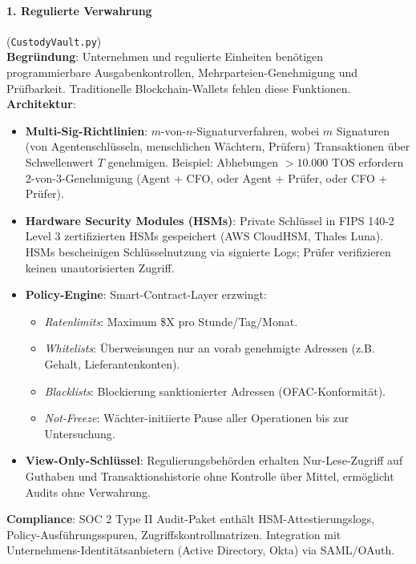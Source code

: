 \documentclass[11pt]{article}
\begin{document}
\paragraph{1. Regulierte Verwahrung} (\texttt{CustodyVault.py})\\
\textbf{Begründung}: Unternehmen und regulierte Einheiten benötigen programmierbare Ausgabenkontrollen, Mehrparteien-Genehmigung und Prüfbarkeit. Traditionelle Blockchain-Wallets fehlen diese Funktionen.\\
\textbf{Architektur}:
\begin{itemize}[noitemsep]
  \item \textbf{Multi-Sig-Richtlinien}: $m$-von-$n$-Signaturverfahren, wobei $m$ Signaturen (von Agentenschlüsseln, menschlichen Wächtern, Prüfern) Transaktionen über Schwellenwert $T$ genehmigen. Beispiel: Abhebungen $>10.000$ TOS erfordern 2-von-3-Genehmigung (Agent + CFO, oder Agent + Prüfer, oder CFO + Prüfer).
  \item \textbf{Hardware Security Modules (HSMs)}: Private Schlüssel in FIPS 140-2 Level 3 zertifizierten HSMs gespeichert (AWS CloudHSM, Thales Luna). HSMs bescheinigen Schlüsselnutzung via signierte Logs; Prüfer verifizieren keinen unautorisierten Zugriff.
  \item \textbf{Policy-Engine}: Smart-Contract-Layer erzwingt:
    \begin{itemize}[noitemsep]
      \item \emph{Ratenlimits}: Maximum \$X pro Stunde/Tag/Monat.
      \item \emph{Whitelists}: Überweisungen nur an vorab genehmigte Adressen (z.B. Gehalt, Lieferantenkonten).
      \item \emph{Blacklists}: Blockierung sanktionierter Adressen (OFAC-Konformität).
      \item \emph{Not-Freeze}: Wächter-initiierte Pause aller Operationen bis zur Untersuchung.
    \end{itemize}
  \item \textbf{View-Only-Schlüssel}: Regulierungsbehörden erhalten Nur-Lese-Zugriff auf Guthaben und Transaktionshistorie ohne Kontrolle über Mittel, ermöglicht Audits ohne Verwahrung.
\end{itemize}
\textbf{Compliance}: SOC 2 Type II Audit-Paket enthält HSM-Attestierungslogs, Policy-Ausführungsspuren, Zugriffskontrollmatrizen. Integration mit Unternehmens-Identitätsanbietern (Active Directory, Okta) via SAML/OAuth.
\end{document}
